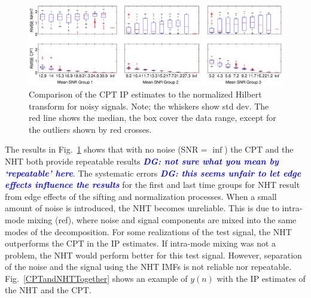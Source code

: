\documentclass[journal,11pt,a4paper,onecolumn,draftcls]{IEEEtran}
\newcommand{\todo}[1]{\textsf{\emph{\textbf{\textcolor{blue}{#1}}}}}
\begin{document}
\begin{figure}[htbp]\label{RMSEComparison}
    \centering
        \includegraphics[scale=.4]{./Figures/SNRcomparisonFigure.eps}
    \caption{Comparison of the CPT IP estimates to the normalized Hilbert transform for noisy signals. Note; the whiskers show std dev. The red line shows the median, the box cover the data range, except for the outliers shown by red crosses.}
\end{figure}

The results in Fig.~\ref{RMSEComparison} shows that with no noise (SNR = $\inf$) the CPT and the NHT both provide repeatable results \todo{DG: not sure what you mean by `repeatable' here}. The systematic errors \todo{DG: this seems unfair to let edge effects influence the results} for the first and last time groups for NHT  result from edge effects of the sifting and normalization processes. When a small amount of noise is introduced, the NHT becomes unreliable. This is due to intra-mode mixing (ref), where noise and signal components are mixed into the same modes of the decomposition. For some realizations of the test signal, the NHT outperforms the CPT in the IP estimates. If intra-mode mixing was not a problem, the NHT would perform better for this test signal. However, separation of the noise and the signal using the NHT IMFs is not reliable nor repeatable. Fig.~\ref{CPTandNHTTogether} shows an example of $y(n)$ with the IP estimates of the NHT and the CPT. 
\end{document}
